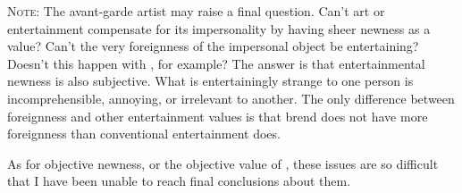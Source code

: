 \vfill

\textsc{Note:} The avant-garde artist may raise a final question. Can't art or 
entertainment compensate for its impersonality by having sheer newness as a 
value? Can't the very foreignness of the impersonal object be entertaining? 
Doesn't this happen with , for example? The answer is 
that entertainmental newness is also subjective. What is entertainingly 
strange to one person is incomprehensible, annoying, or irrelevant to 
another. The only difference between foreignness and other entertainment 
values is that brend does not have more foreignness than conventional 
entertainment does. 

As for objective newness, or the objective value of , these 
issues are so difficult that I have been unable to reach final conclusions 
about them. 

